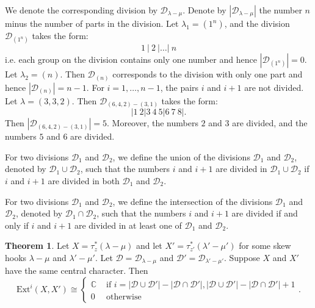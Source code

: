 \documentclass[11pt]{amsart}
\numberwithin{equation}{section}
\theoremstyle{definition}
\newtheorem{theorem}[thm]{Theorem}
\begin{document}
 We denote the corresponding division by $\mathcal D_{\lambda-\mu}$. Denote by \(|\mathcal D_{\lambda-\mu}|\) the number \(n\) minus the number of parts in the division. Let $\lambda_1=(1^n)$, and the division $\mathcal D_{(1^n)}$ takes the form:
\[  1\ |\ 2\ | \ldots |\ n
\]
i.e. each group on the division contains only one number and hence \(|\mathcal D_{(1^n)}|=0\). Let $\lambda_2=(n)$. Then $\mathcal D_{(n)}$ corresponds to the division with only one part  and hence \(|\mathcal D_{(n)}|=n-1\). For \(i=1,\ldots, n-1\), the pairs \(i\) and \(i+1\) are not divided.  Let \(\lambda =(3,3,2)\). Then \(\mathcal D_{(6,4,2)-(3,1)}\) takes the form:
\[    |1\ 2  | 3\ 4\ 5 | 6\ 7\ 8| .
\]
Then \(|\mathcal D_{(6,4,2)-(3,1)}|=5\). Moreover, the numbers \(2\) and \(3\) are divided, and the numbers \(5\) and \(6\) are divided.

For two divisions $\mathcal D_1$ and $\mathcal D_2$, we define the union of the divisions $\mathcal D_1$ and $\mathcal D_2$, denoted by $\mathcal D_1 \cup \mathcal D_2$, such that the numbers $i$ and $i+1$ are divided in $\mathcal D_1\cup \mathcal D_2$ if $i$ and $i+1$ are divided in both $\mathcal D_1$ and $\mathcal D_2$.

For two divisions $\mathcal D_1$ and $\mathcal D_2$, we define the intersection of the divisions $\mathcal D_1$ and $\mathcal D_2$, denoted by $\mathcal D_1 \cap \mathcal D_2$, such that the numbers $i$ and $i+1$ are divided if and only if $i$ and $i+1$ are divided in at least one of $\mathcal D_1$ and $\mathcal D_2$.  


\begin{theorem} \cite{orlik2005extensions} \label{thm combin generalized steinberg}
Let $X=\tau^*_z(\lambda-\mu)$ and let $X'=\tau^*_{z'}(\lambda'-\mu')$ for some skew hooks $\lambda-\mu$ and $\lambda'-\mu'$. Let $\mathcal D=\mathcal D_{\lambda-\mu}$ and $\mathcal D'=\mathcal D_{\lambda'-\mu'}$. Suppose $X$ and $X'$ have the same central character. Then 
\[ \mathrm{Ext}^i(X, X') \cong \begin{cases} \mathbb C & \mbox{ if $i=|\mathcal D\cup \mathcal D'|-|\mathcal D\cap \mathcal D'|, |\mathcal D \cup \mathcal D'|-|\mathcal D\cap \mathcal D'|+1$} \\
0 & \mbox{ otherwise } \end{cases}.
\]
\end{theorem}
\end{document}
